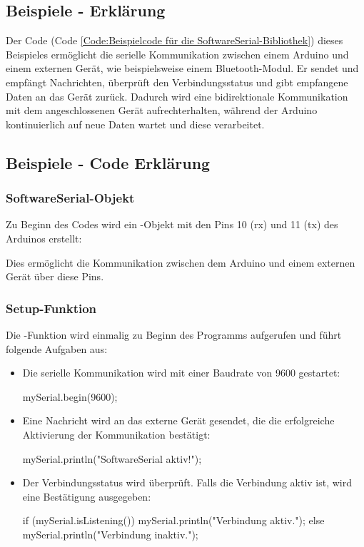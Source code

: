 \subsection{Beispiele - Erklärung}
Der Code (Code \ref{Code:Beispielcode für die SoftwareSerial-Bibliothek}) dieses Beispieles ermöglicht die serielle Kommunikation zwischen einem Arduino und einem externen Gerät, wie beispielsweise einem Bluetooth-Modul. Er sendet und empfängt Nachrichten, überprüft den Verbindungsstatus und gibt empfangene Daten an das Gerät zurück. Dadurch wird eine bidirektionale Kommunikation mit dem angeschlossenen Gerät aufrechterhalten, während der Arduino kontinuierlich auf neue Daten wartet und diese verarbeitet.

\subsection{Beispiele - Code Erklärung}


\subsubsection{SoftwareSerial-Objekt}
Zu Beginn des Codes wird ein -Objekt mit den Pins 10 (\ac{rx}) und 11 (\ac{tx}) des Arduinos erstellt:


Dies ermöglicht die Kommunikation zwischen dem Arduino und einem externen Gerät über diese Pins.

\subsubsection{Setup-Funktion}
Die -Funktion wird einmalig zu Beginn des Programms aufgerufen und führt folgende Aufgaben aus:

\begin{itemize}
	\item Die serielle Kommunikation wird mit einer Baudrate von 9600 gestartet:

		\begin{Arduino}
			{mySerial.begin(9600)};
		\end{Arduino}

	\item Eine Nachricht wird an das externe Gerät gesendet, die die erfolgreiche Aktivierung der Kommunikation bestätigt:

		\begin{Arduino}
			{mySerial.println("SoftwareSerial aktiv!");}
		\end{Arduino}

	\item Der Verbindungsstatus wird überprüft. Falls die Verbindung aktiv ist, wird eine Bestätigung ausgegeben:

	\begin{Arduino}
			if (mySerial.isListening()) {
				mySerial.println("Verbindung aktiv.");
			} else {
				mySerial.println("Verbindung inaktiv.");
			}
	\end{Arduino}
\end{itemize}

